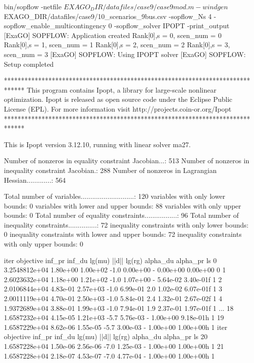 bin/sopflow -netfile $EXAGO_DIR/datafiles/case9/case9mod.m -windgen $EXAGO_DIR/datafiles/case9/10_scenarios_9bus.csv -sopflow_Ns 4 -sopflow_enable_multicontingency 0 -sopflow_solver IPOPT -print_output
[ExaGO] SOPFLOW: Application created
Rank[0],s = 0, scen_num = 0
Rank[0],s = 1, scen_num = 1
Rank[0],s = 2, scen_num = 2
Rank[0],s = 3, scen_num = 3
[ExaGO] SOPFLOW: Using IPOPT solver
[ExaGO] SOPFLOW: Setup completed

******************************************************************************
This program contains Ipopt, a library for large-scale nonlinear optimization.
 Ipopt is released as open source code under the Eclipse Public License (EPL).
         For more information visit http://projects.coin-or.org/Ipopt
******************************************************************************

This is Ipopt version 3.12.10, running with linear solver ma27.

Number of nonzeros in equality constraint Jacobian...:      513
Number of nonzeros in inequality constraint Jacobian.:      288
Number of nonzeros in Lagrangian Hessian.............:      564

Total number of variables............................:      120
                     variables with only lower bounds:        0
                variables with lower and upper bounds:       88
                     variables with only upper bounds:        0
Total number of equality constraints.................:       96
Total number of inequality constraints...............:       72
        inequality constraints with only lower bounds:        0
   inequality constraints with lower and upper bounds:       72
        inequality constraints with only upper bounds:        0

iter    objective    inf_pr   inf_du lg(mu)  ||d||  lg(rg) alpha_du alpha_pr  ls
   0  3.2548812e+04 1.80e+00 1.00e+02  -1.0 0.00e+00    -  0.00e+00 0.00e+00   0
   1  2.6023632e+04 1.18e+00 1.21e+02  -1.0 1.07e+00    -  5.64e-02 3.40e-01f  1
   2  2.0106844e+04 4.83e-01 2.57e+03  -1.0 6.99e-01   2.0 1.02e-02 6.07e-01f  1
   3  2.0011119e+04 4.70e-01 2.50e+03  -1.0 5.84e-01   2.4 1.32e-01 2.67e-02f  1
   4  1.9372689e+04 3.88e-01 1.99e+03  -1.0 7.94e-01   1.9 2.37e-01 1.97e-01f  1
   ...
  18  1.6587232e+04 4.15e-05 1.21e+03  -5.7 5.76e-03    -  1.00e+00 9.18e-01h  1
  19  1.6587229e+04 8.62e-06 1.55e-05  -5.7 3.00e-03    -  1.00e+00 1.00e+00h  1
iter    objective    inf_pr   inf_du lg(mu)  ||d||  lg(rg) alpha_du alpha_pr  ls
  20  1.6587228e+04 1.50e-06 2.56e-06  -7.0 1.25e-03    -  1.00e+00 1.00e+00h  1
  21  1.6587228e+04 2.18e-07 4.53e-07  -7.0 4.77e-04    -  1.00e+00 1.00e+00h  1

